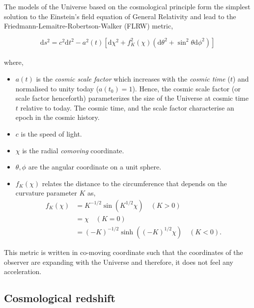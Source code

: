 The models of the Universe based on the cosmological principle form the simplest 
solution to the Einstein's field equation of General Relativity and lead to the
Friedmann-Lemaitre-Robertson-Walker (FLRW) metric,

\begin{equation}
	\mathrm{d}s^2 = c^2\mathrm{d}t^2 - a^2(t)\left[ \mathrm{d}\chi^2 + f_K^2(\chi)
					\left( \mathrm{d}\theta^2 + \sin^2\theta \mathrm{d}\phi^2 
					\right)  \right]
	\label{eqn:metric}
\end{equation}
\\
where, 
\begin{itemize}
\item $a(t)$ is the {\it cosmic scale factor} which increases with the {\it cosmic time} ($t$)
and normalised to unity today ($a(t_0)=1$). 
Hence, the cosmic scale factor (or scale factor henceforth) parameterizes the
size of the Universe at cosmic time $t$ relative to today. The cosmic time, and the scale factor characterise an epoch in the cosmic history.
\item $c$ is the speed of light. 
\item $\chi$ is the
radial {\it comoving} coordinate.
\item $\theta, \phi$ are the angular coordinate on a
unit sphere. 
\item $f_K(\chi)$ relates the distance to the circumference that depends 
on the curvature parameter $K$ as,
\begin{equation} \label{eq1}
\begin{split}
f_K(\chi) & = K^{-1/2} \sin(K^{1/2}\chi) \quad (K>0) \\
 & = \chi \quad (K=0) \\
 & = (-K)^{-1/2} \sinh((-K)^{1/2}\chi) \quad (K<0).
\end{split}
\end{equation}
\end{itemize}

This metric is written in co-moving coordinate such that the coordinates of the
observer are expanding with the Universe and therefore, it does not feel any
acceleration.



\subsection{Cosmological redshift}

